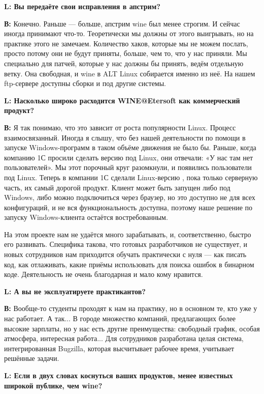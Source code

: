 \documentclass[10pt, a5paper]{article}
\begin{document}
{\noindent \bf L: Вы передаёте свои  исправления в апстрим?}

{\noindent \bf В:} Конечно. Раньше --- больше, апстрим wine был менее строгим. И сейчас иногда принимают что-то. Теоретически мы должны от этого выигрывать, но на практике этого не замечаем. Количество хаков, которые мы не можем послать, просто потому они не будут приняты, больше, чем то, что у нас приняли. Мы специально для патчей, которые у нас должны бы принять, ведём отдельную ветку. Она свободная, и wine в ALT Linux собирается именно из неё. На нашем ftp-сервере доступны сборки и под другие системы.

{\noindent \bf L: Насколько широко расходится  WINE@Etersoft как коммерческий продукт?}

{\noindent \bf В:} Я так понимаю, что это зависит от роста популярности Linux. Процесс взаимосвязанный. Иногда я слышу, что без нашей деятельности по помощи в запуске Windows-программ в таком объёме движения не было бы. Раньше, когда компанию 1С просили сделать версию под Linux, они отвечали: «У нас там нет пользователей». Мы этот порочный круг разомкнули, и появились пользователи под Linux. Теперь в компании 1С сделали Linux-версию , пока только серверную часть, их самый дорогой продукт. Клиент может быть запущен либо под Windows, либо можно подключиться через браузер, но это доступно не для всех конфигураций, и не вся функциональность доступна, поэтому наше решение по запуску Windows-клиента остаётся востребованным.

На этом проекте нам не удаётся много зарабатывать, и, соответственно, быстро его развивать. Специфика такова, что готовых разработчиков не существует, и новых сотрудников нам приходится обучать практически с нуля — как писать код, как отлаживать, какие приёмы использовать для поиска ошибок в бинарном коде. Деятельность не очень благодарная и мало кому нравится.

{\noindent \bf L: А вы не эксплуатируете практикантов?}

{\noindent \bf В:} Вообще-то студенты проходят к нам на практику, но в основном те, кто уже у нас работает. А так... В городе множество компаний, предлагающих более высокие зарплаты, но у нас есть другие преимущества:  свободный график, особая атмосфера, интересная работа... Для сотрудников разработана целая система,  интегрированная  Bugzilla, которая высчитывает рабочее время, учитывает решённые задачи.

{\noindent \bf L: Если в двух словах коснуться ваших продуктов, менее известных широкой публике, чем wine?}
\end{document}
